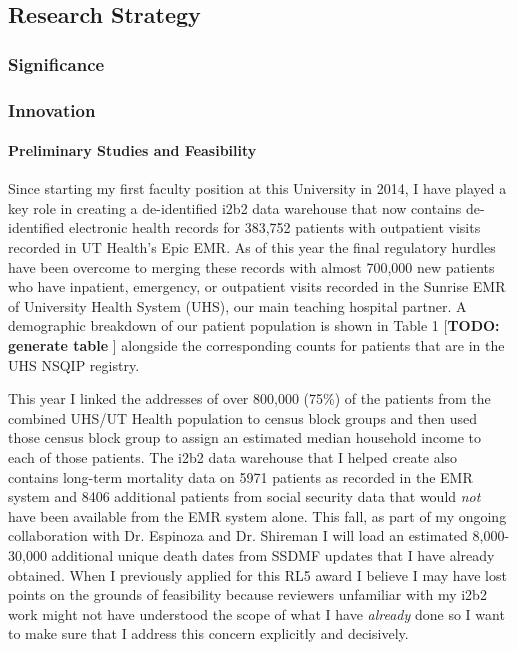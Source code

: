 \subsection{Research Strategy}\label{research-strategy}


\subsubsection{Significance}\label{significance}

\subsubsection{Innovation}\label{innovation}

\paragraph{Preliminary Studies and Feasibility}\label{preliminary-studies-and-feasibility} 
Since starting my first faculty position at this University in 2014, I have played a key role in creating a de-identified i2b2 data warehouse that now contains de-identified electronic health records for 383,752 patients with outpatient visits recorded in UT Health's Epic EMR. As of this year the final regulatory hurdles have been overcome to merging these records with almost 700,000 new patients who have inpatient, emergency, or outpatient visits recorded in the Sunrise EMR of University Health System (UHS), our main teaching hospital partner. A demographic breakdown of our patient population is shown in Table 1 [\textbf{TODO: generate table }] alongside the corresponding counts for patients that are in the UHS NSQIP registry.

This year I linked the addresses of over 800,000 (75\%) of the patients from the combined UHS/UT Health population to census block groups and then used those census block group to assign an estimated median household income to each of those patients. The i2b2 data warehouse that I helped create also contains long-term mortality data on 5971 patients as recorded in the EMR system and 8406 additional patients from social security data that would \textit{not} have been available from the EMR system alone. This fall, as part of my ongoing collaboration with Dr. Espinoza and Dr. Shireman I will load an estimated 8,000-30,000 additional unique death dates from SSDMF updates that I have already obtained. When I previously applied for this RL5 award I believe I may have lost points on the grounds of feasibility because reviewers unfamiliar with my i2b2 work might not have understood the scope of what I have \textit{already} done so I want to make sure that I address this concern explicitly and decisively.

